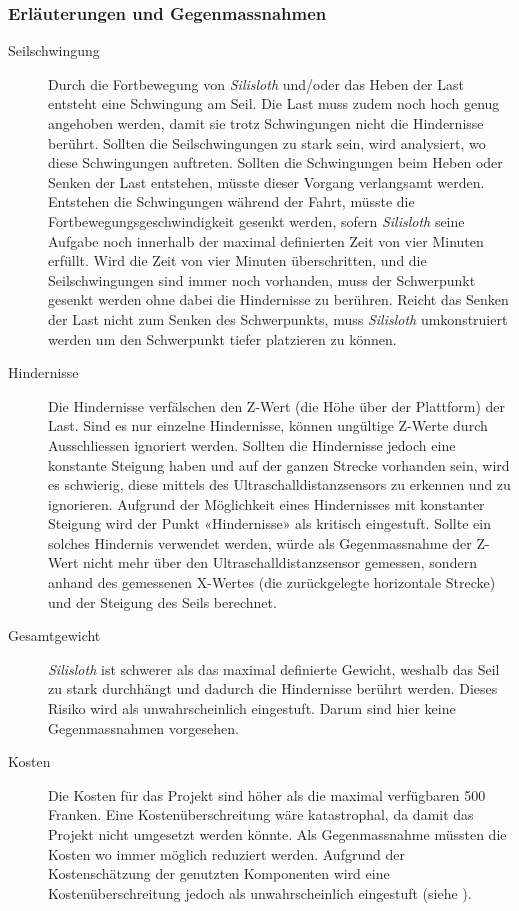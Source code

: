 \subsubsection{Erläuterungen und Gegenmassnahmen}

\begin{description}
    \item[Seilschwingung] Durch die Fortbewegung von \textit{Silisloth} und/oder das Heben der Last entsteht eine Schwingung am Seil. Die Last muss zudem noch hoch genug angehoben werden, damit sie trotz Schwingungen nicht die Hindernisse berührt. Sollten die Seilschwingungen zu stark sein, wird analysiert, wo diese Schwingungen auftreten. Sollten die Schwingungen beim Heben oder Senken der Last entstehen, müsste dieser Vorgang verlangsamt werden. Entstehen die Schwingungen während der Fahrt, müsste die Fortbewegungsgeschwindigkeit gesenkt werden, sofern \textit{Silisloth} seine Aufgabe noch innerhalb der maximal definierten Zeit von vier Minuten erfüllt. Wird die Zeit von vier Minuten überschritten, und die Seilschwingungen sind immer noch vorhanden, muss der Schwerpunkt gesenkt werden ohne dabei die Hindernisse zu berühren. Reicht das Senken der Last nicht zum Senken des Schwerpunkts, muss \textit{Silisloth} umkonstruiert werden um den Schwerpunkt tiefer platzieren zu können.
\item[Hindernisse] Die Hindernisse verfälschen den Z-Wert (die Höhe über der Plattform) der Last. Sind es nur einzelne Hindernisse, können ungültige Z-Werte durch Ausschliessen ignoriert werden. Sollten die Hindernisse jedoch eine konstante Steigung haben und auf der ganzen Strecke vorhanden sein, wird es schwierig, diese mittels des Ultraschalldistanzsensors zu erkennen und zu ignorieren. Aufgrund der Möglichkeit eines Hindernisses mit konstanter Steigung wird der Punkt «Hindernisse» als kritisch eingestuft. Sollte ein solches Hindernis verwendet werden, würde als Gegenmassnahme der Z-Wert nicht mehr über den Ultraschalldistanzsensor gemessen, sondern anhand des gemessenen X-Wertes (die zurückgelegte horizontale Strecke) und der Steigung des Seils berechnet.
\item[Gesamtgewicht] \textit{Silisloth} ist schwerer als das maximal definierte Gewicht, weshalb das Seil zu stark durchhängt und dadurch die Hindernisse berührt werden. Dieses Risiko wird als unwahrscheinlich eingestuft. Darum sind hier keine Gegenmassnahmen vorgesehen.
\item[Kosten] Die Kosten für das Projekt sind höher als die maximal verfügbaren 500 Franken. Eine Kostenüberschreitung wäre katastrophal, da damit das Projekt nicht umgesetzt werden könnte. Als Gegenmassnahme müssten die Kosten wo immer möglich reduziert werden. Aufgrund der Kostenschätzung der genutzten Komponenten wird eine Kostenüberschreitung jedoch als unwahrscheinlich eingestuft (siehe ). 

\end{description}
